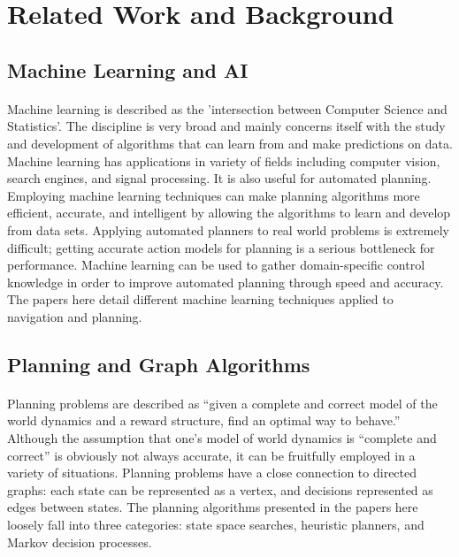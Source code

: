 \documentclass[tog]{acmsiggraph}
\begin{document}
\section{Related Work and Background}

\subsection{Machine Learning and AI}


\paragraph{}

Machine learning is described as the 'intersection between Computer Science and Statistics'.  The discipline is very broad and mainly concerns itself with the study and development of algorithms that can learn from and make predictions on data. Machine learning has applications in variety of fields including computer vision, search engines, and signal processing. It is also useful for automated planning.  Employing machine learning techniques can make planning algorithms more efficient, accurate, and intelligent by allowing the algorithms to learn and develop from data sets. Applying automated planners to real world problems is extremely difficult; getting accurate action models for planning  is a serious bottleneck for performance. Machine learning can be used to gather domain-specific control knowledge in order to improve automated planning through speed and accuracy. The papers here detail different machine learning techniques applied to navigation and planning.
\subsection{Planning and Graph Algorithms}

\paragraph{}

Planning problems are described as ``given a complete and correct model of the world dynamics and a reward structure, find an optimal way to behave.'' Although the assumption that one's model of world dynamics is ``complete and correct'' is obviously not always accurate, it can be fruitfully employed in a variety of situations. Planning problems have a close connection to directed graphs: each state can be represented as a vertex, and decisions represented as edges between states. The planning algorithms presented in the papers here loosely fall into three categories: state space searches, heuristic planners, and Markov decision processes.
\end{document}
